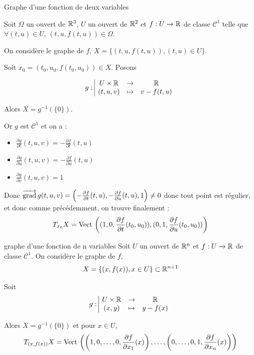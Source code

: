 \begin{exemple}
    Graphe d'une fonction de deux variables 

    Soit $\Omega$ un ouvert de $\mathbb{R}^3$, $U$ un ouvert de $\mathbb{R}^2$ et 
    $f : U \to \mathbb{R}$ de classe $\mathscr C^1$ telle que $\forall (t, u) \in U$, $(t, u, f(t, u)) \in \Omega$.

    On considère le graphe de $f$, $X = \{(t, u, f(t, u)), (t, u) \in U\}$. 

    Soit $x_0 = (t_0, u_0, f(t_0, u_0)) \in X$.
    Posons 
    
    $$g: \space \begin{array}{|ccc} \displaystyle U \times \mathbb{R} & \to & \displaystyle \mathbb{R} \\ \displaystyle (t, u, v) & \mapsto & \displaystyle v - f(t, u) \end{array}$$

    Alors $X = g^{-1}(\{0\})$.

    Or $g$ est $\mathscr C^1$ et on a : 
    \begin{itemize}
        \item $\displaystyle \frac{\partial g}{\partial t}(t, u, v) = - \frac{\partial f}{\partial t}(t, u)$
        \item $\displaystyle \frac{\partial g}{\partial u}(t, u, v) = - \frac{\partial f}{\partial u}(t, u)$
        \item $\displaystyle \frac{\partial g}{\partial v}(t, u, v) = 1$
    \end{itemize}

    Donc $\overrightarrow{\operatorname{grad}} \, g(t, u, v) = \left(- \frac{\partial f}{\partial t}(t, u), - \frac{\partial f}{\partial u}(t, u), 1 \right) \neq 0$
    donc tout point est régulier, et donc comme précédemment, on trouve finalement : 
    $$T_{x_0}X = \operatorname{Vect} \,\left( (1, 0, \frac{\partial f}{\partial t}(t_0, u_0)), (0, 1, \frac{\partial f}{\partial u}(t_0, u_0)) \right)$$
\end{exemple}

\begin{propositionnt}{graphe d'une fonction de n variables}{}
    Soit $U$ un ouvert de $\mathbb{R}^n$ et $f : U \to \mathbb{R}$ de classe $\mathscr C^1$.
    On considère le graphe de $f$, 
    $$X = \{(x, f(x)), x \in U\} \subset \mathbb{R}^{n+1}$$

    Soit 
    $$g: \space \begin{array}{|ccc} \displaystyle U \times \mathbb{R} & \to & \displaystyle \mathbb{R} \\ \displaystyle (x, y) & \mapsto & \displaystyle y - f(x) \end{array}$$

    Alors $X = g^{-1}(\{0\})$ et pour $x \in U$,
    $$T_{(x, f(x))}X =  \operatorname{Vect} \, \left( \left(1, 0, \ldots, 0, \frac{\partial f}{\partial x_1}(x) \right), \ldots, \left(0, \ldots, 0, 1, \frac{\partial f}{\partial x_n}(x) \right) \right)$$
\end{propositionnt}



